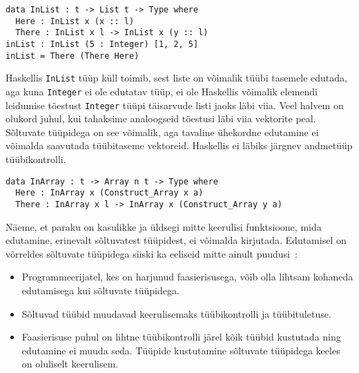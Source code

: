 \documentclass[12pt]{article}
\begin{document}
      \begin{verbatim}data InList : t -> List t -> Type where
  Here : InList x (x :: l)
  There : InList x l -> InList x (y :: l)
inList : InList (5 : Integer) [1, 2, 5]
inList = There (There Here)\end{verbatim}

      Haskellis \verb!InList! tüüp küll toimib, sest liste on võimalik tüübi tasemele edutada, aga kuna \verb!Integer! ei ole edutatav tüüp, ei ole Haskellis võimalik elemendi leidumise tõestust \verb!Integer! tüüpi täisarvude listi jaoks läbi viia. Veel halvem on olukord juhul, kui tahaksime analoogseid tõestusi läbi viia vektorite peal. Sõltuvate tüüpidega on see võimalik, aga tavaline ühekordne edutamine ei võimalda saavutada tüübitaseme vektoreid. Haskellis ei läbiks järgnev andmetüüp tüübikontrolli.

      \begin{verbatim}data InArray : t -> Array n t -> Type where
  Here : InArray x (Construct_Array x a)
  There : InArray x l -> InArray x (Construct_Array y a)\end{verbatim}

      Näeme, et paraku on kasulikke ja üldsegi mitte keerulisi funktsioone, mida edutamine, erinevalt sõltuvatest tüüpidest, ei võimalda kirjutada. Edutamisel on võrreldes sõltuvate tüüpidega siiski ka eeliseid mitte ainult puudusi~\cite{Giv}:

      \begin{itemize}
        \item
          Programmeerijatel, kes on harjunud faasierisusega, võib olla lihtsam kohaneda edutamisega kui sõltuvate tüüpidega.
        \item
          Sõltuvad tüübid muudavad keerulisemaks tüübikontrolli ja tüübituletuse.
        \item
          Faasierisuse puhul on lihtne tüübikontrolli järel kõik tüübid kustutada ning edutamine ei muuda seda. Tüüpide kustutamine sõltuvate tüüpidega keeles on oluliselt keerulisem.
      \end{itemize}
\end{document}
